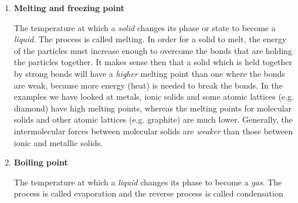       \label{m38734*id309108}\begin{enumerate}[noitemsep, label=\textbf{\arabic*}. ] 
            \label{m38734*uid43}\item \textbf{Melting and freezing point}
\par
 { \label{m38734*meaningfhsst!!!underscore!!!id276}
The temperature at which a \textsl{solid} changes 
its phase or state to become a \textsl{liquid}. The 
process is called melting. 
 } 
In order for a solid to melt, the energy of the particles 
must increase enough to overcome the bonds that are holding the particles 
together. It makes sense then that a solid which is held together by strong 
bonds will have a \textsl{higher} melting point 
than one where the bonds are weak, because more energy (heat) is needed to break 
the bonds. In the examples we have looked at metals, ionic solids and some 
atomic lattices (e.g. diamond) have high melting points, whereas the melting 
points for molecular solids and other atomic lattices (e.g. graphite) are much 
lower. Generally, the intermolecular forces between molecular solids are 
\textsl{weaker} than those between ionic and 
metallic solids.
\label{m38734*uid44}\item \textbf{Boiling point}
\par
            \label{m38734*fhsst!!!underscore!!!id282}
 { \label{m38734*meaningfhsst!!!underscore!!!id282}
The temperature at which a \textsl{liquid} changes 
its phase to become a \textsl{gas}. The process is 
called evaporation and the reverse process is called condensation 
 } 

\end{enumerate}
